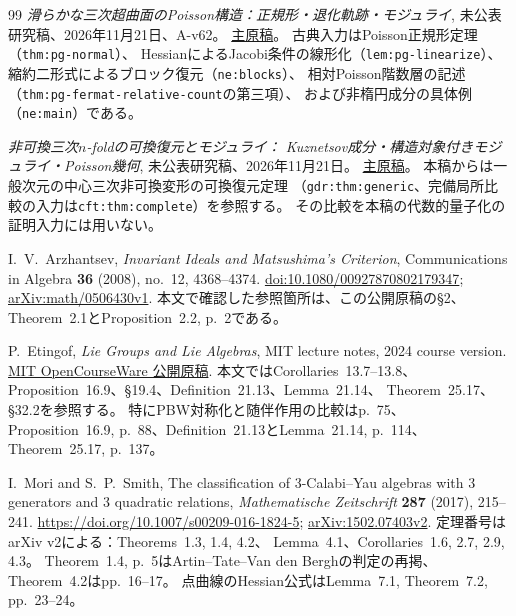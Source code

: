 \begin{thebibliography}{99}
\small
{}
\emph{滑らかな三次超曲面のPoisson構造：正規形・退化軌跡・モジュライ},
未公表研究稿、2026年11月21日、A-v62。
\href{https://github.com/uedakazushi/poisson-cubic/blob/9f91efa3465f18219c36c31750f1e66220faeaa7/papers/poisson-cubic.tex}{主原稿}。
古典入力はPoisson正規形定理（\texttt{thm:pg-normal}）、
HessianによるJacobi条件の線形化（\texttt{lem:pg-linearize}）、
縮約二形式によるブロック復元（\texttt{ne:blocks}）、
相対Poisson階数層の記述（\texttt{thm:pg-fermat-relative-count}の第三項）、
および非楕円成分の具体例（\texttt{ne:main}）である。

\emph{非可換三次$ n$-foldの可換復元とモジュライ：
Kuznetsov成分・構造対象付きモジュライ・Poisson幾何},
未公表研究稿、2026年11月21日。
\href{https://github.com/uedakazushi/nc-cubic/blob/main/papers/nc-cubic.tex}{主原稿}。
本稿からは一般次元の中心三次非可換変形の可換復元定理
（\texttt{gdr:thm:generic}、完備局所比較の入力は\texttt{cft:thm:complete}）を参照する。
その比較を本稿の代数的量子化の証明入力には用いない。

I.~V.~Arzhantsev,
\emph{Invariant Ideals and Matsushima's Criterion},
Communications in Algebra \textbf{36} (2008), no.~12, 4368--4374.
\href{https://doi.org/10.1080/00927870802179347}{doi:10.1080/00927870802179347};
\href{https://arxiv.org/abs/math/0506430v1}{arXiv:math/0506430v1}.
本文で確認した参照箇所は、この公開原稿の\S2、
Theorem~2.1とProposition~2.2, p.~2である。

P.~Etingof,
\emph{Lie Groups and Lie Algebras}, MIT lecture notes, 2024 course version.
\href{https://live.ocw.mit.edu/courses/18-755-lie-groups-and-lie-algebras-ii-spring-2024/mit18_755_s24_lec_full.pdf}{MIT OpenCourseWare 公開原稿}.
本文ではCorollaries~13.7--13.8、Proposition~16.9、\S19.4、Definition~21.13、Lemma~21.14、
Theorem~25.17、\S32.2を参照する。
特にPBW対称化と随伴作用の比較はp.~75、
Proposition~16.9, p.~88、Definition~21.13とLemma~21.14, p.~114、
Theorem~25.17, p.~137。

I.~Mori and S.~P.~Smith,
The classification of 3-Calabi--Yau algebras with 3 generators and 3 quadratic relations,
\emph{Mathematische Zeitschrift} \textbf{287} (2017), 215--241.
\url{https://doi.org/10.1007/s00209-016-1824-5};
\href{https://arxiv.org/abs/1502.07403v2}{arXiv:1502.07403v2}.
定理番号はarXiv v2による：Theorems~1.3, 1.4, 4.2、
Lemma~4.1、Corollaries~1.6, 2.7, 2.9, 4.3。
Theorem~1.4, p.~5はArtin--Tate--Van den Berghの判定の再掲、
Theorem~4.2はpp.~16--17。
点曲線のHessian公式はLemma~7.1, Theorem~7.2, pp.~23--24。


\end{thebibliography}

